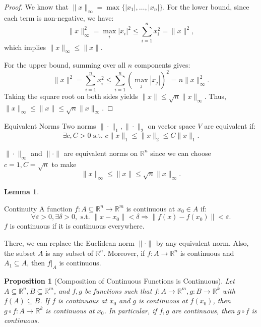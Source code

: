 \documentclass[11pt]{article}
\makeatletter
\newcounter{thmcounter}
\newenvironment{definition}[1]{\begin{defbox}{#1}{}}{\end{defbox}}
\newenvironment{theorem}[1]{\begin{thmbox}{#1}{}}{\end{thmbox}}
\newenvironment{example}[1]{\begin{exbox}{#1}{}}{\end{exbox}}
\theoremstyle{quiet}
\newtheorem{proposition}[thmcounter]{Proposition}
\newtheorem{lemma}[thmcounter]{Lemma}
\newtheorem{proposition}[tcb@cnt@defbox]{Proposition}
\newtheorem{lemma}[tcb@cnt@defbox]{Lemma}
\theoremstyle{quietremark}
\makeatother
\begin{document}
\begin{theorem}{}
\end{theorem}
\begin{proof}
We know that $\|x\|_\infty = \max \{|x_1|, \dots, |x_n|\}$. 
For the lower bound, since each term is non-negative, we have:
\[
\|x\|_\infty^2 = \max_i |x_i|^2 \le \sum_{i=1}^n x_i^2 = \|x\|^2,
\]
which implies $\|x\|_\infty \le \|x\|$.

For the upper bound, summing over all $n$ components gives:
\[
\|x\|^2 = \sum_{i=1}^n x_i^2 \le \sum_{i=1}^n \left(\max_j |x_j|\right)^2 = n \|x\|_\infty^2.
\]
Taking the square root on both sides yields $\|x\| \le \sqrt{n} \|x\|_\infty$.
Thus, $\|x\|_\infty \le \|x\| \le \sqrt{n} \|x\|_\infty$.
\end{proof}
\begin{definition}{Equivalent Norms}
Two norms $\|\cdot\|_1, \|\cdot\|_2$ on vector space $V$ are equivalent if:
\[
\exists c,C>0 \text{ s.t. } c\|x\|_1\le\|x\|_2\le C\|x\|_1.
\]
\end{definition}

\begin{example}{}
$\|\cdot\|_\infty$ and $\|\cdot\|$ are equivalent norms on $\mathbb{R}^n$ since we can choose $c=1, C=\sqrt{n}$ to make 
\[
\|x\|_\infty \le \|x\| \le \sqrt{n}\|x\|_\infty.
\]
\end{example}

\begin{lemma}
\end{lemma}

\begin{definition}{Continuity}
A function $f:A\subseteq\mathbb{R}^n\to\mathbb{R}^m$ is continuous at $x_0\in A$ if:
\[
\forall\varepsilon>0,\exists\delta>0, \text{ s.t. }\|x-x_0\|<\delta\Rightarrow \|f(x)-f(x_0)\|<\varepsilon.
\]
$f$ is continuous if it is continuous everywhere.
\end{definition}

There, we can replace the Euclidean norm $\|\cdot\|$ by any equivalent norm. Also, the subset $A$ is any subset of $\mathbb{R}^n$. Moreover, if $f:A\to\mathbb{R}^n$ is continuous and $A_1\subseteq A$, then $f|_A$ is continuous.

\begin{proposition}[Composition of Continuous Functions is Continuous]
Let $A\subseteq\mathbb{R}^n, B\subseteq\mathbb{R}^m$, and $f,g$ be functions such that $f:A\to\mathbb{R}^m, g:B\to\mathbb{R}^k$ with $f(A)\subseteq B$. If $f$ is continuous at $x_0$ and $g$ is continuous at $f(x_0)$, then $g\circ f:A\to\mathbb{R}^k$ is continuous at $x_0$. In particular, if $f,g$ are continuous, then $g\circ f$ is continuous.
\end{proposition}
\end{document}
